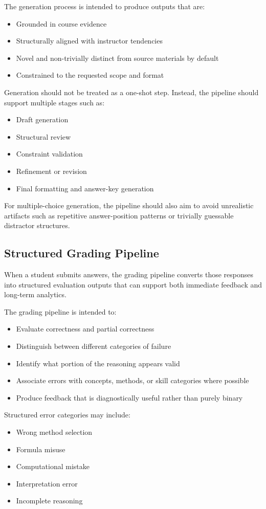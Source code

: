 \documentclass[11pt]{article}
\begin{document}
The generation process is intended to produce outputs that are:
\begin{itemize}
\item Grounded in course evidence
\item Structurally aligned with instructor tendencies
\item Novel and non-trivially distinct from source materials by default
\item Constrained to the requested scope and format
\end{itemize}

Generation should not be treated as a one-shot step. Instead, the pipeline should support multiple stages such as:
\begin{itemize}
\item Draft generation
\item Structural review
\item Constraint validation
\item Refinement or revision
\item Final formatting and answer-key generation
\end{itemize}

For multiple-choice generation, the pipeline should also aim to avoid unrealistic artifacts such as repetitive answer-position patterns or trivially guessable distractor structures.

\subsection{Structured Grading Pipeline}
When a student submits answers, the grading pipeline converts those responses into structured evaluation outputs that can support both immediate feedback and long-term analytics.

The grading pipeline is intended to:
\begin{itemize}
\item Evaluate correctness and partial correctness
\item Distinguish between different categories of failure
\item Identify what portion of the reasoning appears valid
\item Associate errors with concepts, methods, or skill categories where possible
\item Produce feedback that is diagnostically useful rather than purely binary
\end{itemize}

Structured error categories may include:
\begin{itemize}
\item Wrong method selection
\item Formula misuse
\item Computational mistake
\item Interpretation error
\item Incomplete reasoning
\end{itemize}
\end{document}
